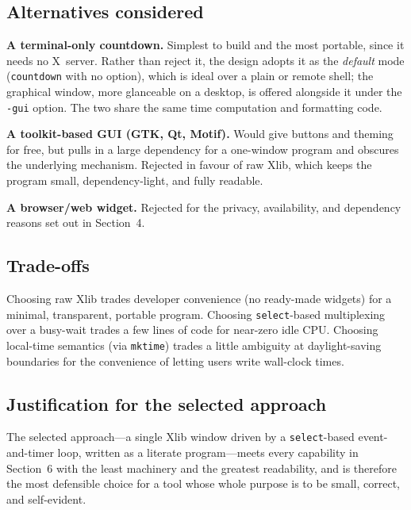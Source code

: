 \documentclass[12pt]{article}
\newcommand{\code}[1]{\texttt{#1}}
\begin{document}
\subsection{Alternatives considered}

\textbf{A terminal-only countdown.}  Simplest to build and the most
portable, since it needs no X~server.  Rather than reject it, the design
adopts it as the \emph{default} mode (\code{countdown} with no option),
which is ideal over a plain or remote shell; the graphical window, more
glanceable on a desktop, is offered alongside it under the \code{-gui}
option.  The two share the same time computation and formatting code.

\medskip\noindent
\textbf{A toolkit-based GUI (GTK, Qt, Motif).}  Would give buttons and
theming for free, but pulls in a large dependency for a one-window program
and obscures the underlying mechanism.  Rejected in favour of raw Xlib,
which keeps the program small, dependency-light, and fully readable.

\medskip\noindent
\textbf{A browser/web widget.}  Rejected for the privacy, availability,
and dependency reasons set out in Section~4.

\subsection{Trade-offs}

Choosing raw Xlib trades developer convenience (no ready-made widgets) for
a minimal, transparent, portable program.  Choosing \code{select}-based
multiplexing over a busy-wait trades a few lines of code for near-zero idle
CPU.  Choosing local-time semantics (via \code{mktime}) trades a little
ambiguity at daylight-saving boundaries for the convenience of letting
users write wall-clock times.

\subsection{Justification for the selected approach}

The selected approach---a single Xlib window driven by a
\code{select}-based event-and-timer loop, written as a literate
program---meets every capability in Section~6 with the least machinery and
the greatest readability, and is therefore the most defensible choice for
a tool whose whole purpose is to be small, correct, and self-evident.
\end{document}

